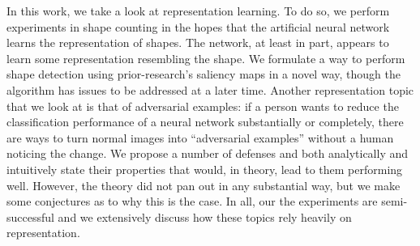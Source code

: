 In this work, we take a look at representation learning. To do so, we perform experiments in shape
counting in the hopes that the artificial neural network learns the representation of shapes. The
network, at least in part, appears to learn some representation resembling the shape. We formulate a
way to perform shape detection using prior-research's saliency maps in a novel way, though the
algorithm has issues to be addressed at a later time. Another representation topic that we look at
is that of adversarial examples: if a person wants to reduce the classification performance of a
neural network substantially or completely, there are ways to turn normal images into ``adversarial
examples'' without a human noticing the change. We propose a number of defenses and both
analytically and intuitively state their properties that would, in theory, lead to them performing
well. However, the theory did not pan out in any substantial way, but we make some conjectures as to
why this is the case. In all, our the experiments are semi-successful and we extensively discuss how
these topics rely heavily on representation.